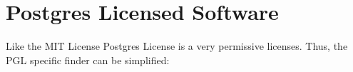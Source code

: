 %
%
%
%
%



\section{Postgres Licensed Software}

Like the MIT License Postgres License is a very permissive licenses. Thus, the
PGL specific finder can be simplified:

